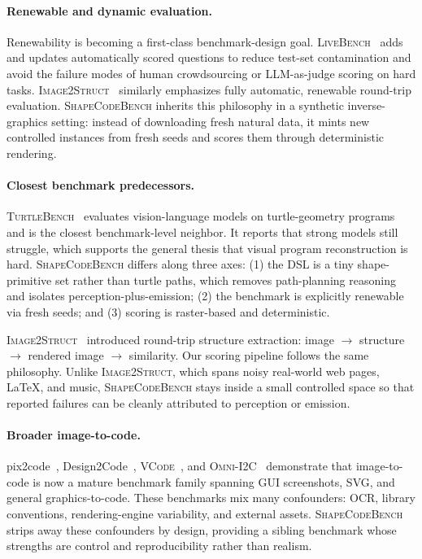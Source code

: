 \paragraph{Renewable and dynamic evaluation.}
Renewability is becoming a first-class benchmark-design goal. \textsc{LiveBench}~\cite{white2024livebench}
adds and updates automatically scored questions to reduce test-set
contamination and avoid the failure modes of human crowdsourcing or LLM-as-judge
scoring on hard tasks. \textsc{Image2Struct}~\cite{roberts2024image2struct}
similarly emphasizes fully automatic, renewable round-trip evaluation. \textsc{ShapeCodeBench}
inherits this philosophy in a synthetic inverse-graphics setting: instead of
downloading fresh natural data, it mints new controlled instances from fresh
seeds and scores them through deterministic rendering.

\paragraph{Closest benchmark predecessors.}
\textsc{TurtleBench}~\cite{rismanchian2025turtlebench} evaluates vision-language
models on turtle-geometry programs and is the closest benchmark-level neighbor.
It reports that strong models still struggle, which supports the general thesis
that visual program reconstruction is hard. \textsc{ShapeCodeBench} differs along three
axes: (1) the DSL is a tiny shape-primitive set rather than turtle paths, which
removes path-planning reasoning and isolates perception-plus-emission; (2) the
benchmark is explicitly renewable via fresh seeds; and (3) scoring is raster-based
and deterministic.

\textsc{Image2Struct}~\cite{roberts2024image2struct} introduced round-trip
structure extraction: image $\rightarrow$ structure $\rightarrow$ rendered image
$\rightarrow$ similarity. Our scoring pipeline follows the same philosophy.
Unlike \textsc{Image2Struct}, which spans noisy real-world web pages, LaTeX, and
music, \textsc{ShapeCodeBench} stays inside a small controlled space so that reported
failures can be cleanly attributed to perception or emission.

\paragraph{Broader image-to-code.}
pix2code~\cite{beltramelli2017pix2code}, Design2Code~\cite{si2024design2code},
\textsc{VCode}~\cite{lin2025vcode}, and \textsc{Omni-I2C}~\cite{zhou2026omni}
demonstrate that image-to-code is now a mature benchmark family spanning GUI
screenshots, SVG, and general graphics-to-code. These benchmarks mix many
confounders: OCR, library conventions, rendering-engine variability, and external
assets. \textsc{ShapeCodeBench} strips away these confounders by design, providing a
sibling benchmark whose strengths are control and reproducibility rather than
realism.

